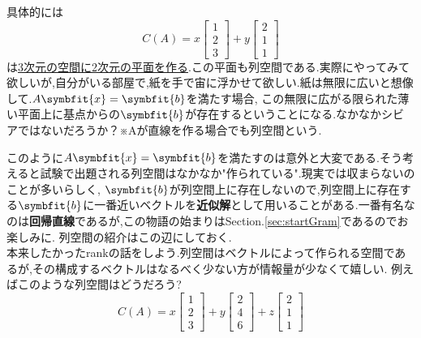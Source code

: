 具体的には
\[
C(A)=
x
\begin{bmatrix}1 \\2 \\3\end{bmatrix}
+y
\begin{bmatrix}2 \\ 1 \\ 1\end{bmatrix}
\]
は\underline{3次元の空間に2次元の平面を作る}.この平面も列空間である.実際にやってみて欲しいが,自分がいる部屋で,紙を手で宙に浮かせて欲しい.紙は無限に広いと想像して.$A\symbfit{x}=\symbfit{b}$を満たす場合,
この無限に広がる限られた薄い平面上に基点からの$\symbfit{b}$が存在するということになる.なかなかシビアではないだろうか？※Aが直線を作る場合でも列空間という.

このように$A\symbfit{x}=\symbfit{b}$を満たすのは意外と大変である.そう考えると試験で出題される列空間はなかなか"作られている".現実では収まらないのことが多いらしく,
$\symbfit{b}$が列空間上に存在しないので,列空間上に存在する$\symbfit{b}$に一番近いベクトルを\textbf{近似解}として用いることがある.一番有名なのは\textbf{回帰直線}であるが,この物語の始まりはSection.\ref{sec:startGram}であるのでお楽しみに.
列空間の紹介はこの辺にしておく.\\

本来したかったrankの話をしよう.列空間はベクトルによって作られる空間であるが,その構成するベクトルはなるべく少ない方が情報量が少なくて嬉しい.
例えばこのような列空間はどうだろう?
\[
C(A)=
x
\begin{bmatrix}1 \\2 \\3\end{bmatrix}
+y
\begin{bmatrix}2 \\ 4 \\ 6\end{bmatrix}
+z
\begin{bmatrix}2 \\ 1 \\ 1\end{bmatrix}
\]

